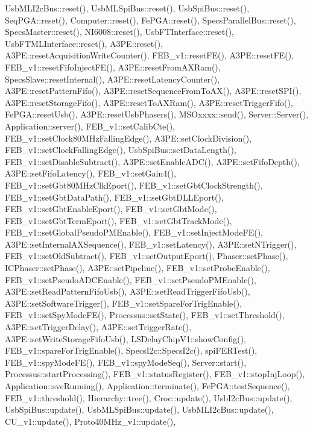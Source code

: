Usb\+M\+L\+I2c\+Bus\+::reset(), Usb\+M\+L\+Spi\+Bus\+::reset(), Usb\+Spi\+Bus\+::reset(), Seq\+P\+G\+A\+::reset(), Computer\+::reset(), Fe\+P\+G\+A\+::reset(), Specs\+Parallel\+Bus\+::reset(), Specs\+Master\+::reset(), N\+I6008\+::reset(), Usb\+F\+T\+Interface\+::reset(), Usb\+F\+T\+M\+L\+Interface\+::reset(), A3\+P\+E\+::reset(), A3\+P\+E\+::reset\+Acquisition\+Write\+Counter(), F\+E\+B\+\_\+v1\+::reset\+F\+E(), A3\+P\+E\+::reset\+F\+E(), F\+E\+B\+\_\+v1\+::reset\+Fifo\+Inject\+F\+E(), A3\+P\+E\+::reset\+From\+A\+X\+Ram(), Specs\+Slave\+::reset\+Internal(), A3\+P\+E\+::reset\+Latency\+Counter(), A3\+P\+E\+::reset\+Pattern\+Fifo(), A3\+P\+E\+::reset\+Sequence\+From\+To\+A\+X(), A3\+P\+E\+::reset\+S\+P\+I(), A3\+P\+E\+::reset\+Storage\+Fifo(), A3\+P\+E\+::reset\+To\+A\+X\+Ram(), A3\+P\+E\+::reset\+Trigger\+Fifo(), Fe\+P\+G\+A\+::reset\+Usb(), A3\+P\+E\+::reset\+Usb\+Phasers(), M\+S\+Oxxxx\+::send(), Server\+::\+Server(), Application\+::server(), F\+E\+B\+\_\+v1\+::set\+Calib\+Cte(), F\+E\+B\+\_\+v1\+::set\+Clock80\+M\+Hz\+Falling\+Edge(), A3\+P\+E\+::set\+Clock\+Division(), F\+E\+B\+\_\+v1\+::set\+Clock\+Falling\+Edge(), Usb\+Spi\+Bus\+::set\+Data\+Length(), F\+E\+B\+\_\+v1\+::set\+Disable\+Subtract(), A3\+P\+E\+::set\+Enable\+A\+D\+C(), A3\+P\+E\+::set\+Fifo\+Depth(), A3\+P\+E\+::set\+Fifo\+Latency(), F\+E\+B\+\_\+v1\+::set\+Gain4(), F\+E\+B\+\_\+v1\+::set\+Gbt80\+M\+Hz\+Clk\+Eport(), F\+E\+B\+\_\+v1\+::set\+Gbt\+Clock\+Strength(), F\+E\+B\+\_\+v1\+::set\+Gbt\+Data\+Path(), F\+E\+B\+\_\+v1\+::set\+Gbt\+D\+L\+L\+Eport(), F\+E\+B\+\_\+v1\+::set\+Gbt\+Enable\+Eport(), F\+E\+B\+\_\+v1\+::set\+Gbt\+Mode(), F\+E\+B\+\_\+v1\+::set\+Gbt\+Term\+Eport(), F\+E\+B\+\_\+v1\+::set\+Gbt\+Track\+Mode(), F\+E\+B\+\_\+v1\+::set\+Global\+Pseudo\+P\+M\+Enable(), F\+E\+B\+\_\+v1\+::set\+Inject\+Mode\+F\+E(), A3\+P\+E\+::set\+Internal\+A\+X\+Sequence(), F\+E\+B\+\_\+v1\+::set\+Latency(), A3\+P\+E\+::set\+N\+Trigger(), F\+E\+B\+\_\+v1\+::set\+Old\+Subtract(), F\+E\+B\+\_\+v1\+::set\+Output\+Eport(), Phaser\+::set\+Phase(), I\+C\+Phaser\+::set\+Phase(), A3\+P\+E\+::set\+Pipeline(), F\+E\+B\+\_\+v1\+::set\+Probe\+Enable(), F\+E\+B\+\_\+v1\+::set\+Pseudo\+A\+D\+C\+Enable(), F\+E\+B\+\_\+v1\+::set\+Pseudo\+P\+M\+Enable(), A3\+P\+E\+::set\+Read\+Pattern\+Fifo\+Usb(), A3\+P\+E\+::set\+Read\+Trigger\+Fifo\+Usb(), A3\+P\+E\+::set\+Software\+Trigger(), F\+E\+B\+\_\+v1\+::set\+Spare\+For\+Trig\+Enable(), F\+E\+B\+\_\+v1\+::set\+Spy\+Mode\+F\+E(), Processus\+::set\+State(), F\+E\+B\+\_\+v1\+::set\+Threshold(), A3\+P\+E\+::set\+Trigger\+Delay(), A3\+P\+E\+::set\+Trigger\+Rate(), A3\+P\+E\+::set\+Write\+Storage\+Fifo\+Usb(), L\+S\+Delay\+Chip\+V1\+::show\+Config(), F\+E\+B\+\_\+v1\+::spare\+For\+Trig\+Enable(), Specs\+I2c\+::\+Specs\+I2c(), spi\+F\+E\+R\+Test(), F\+E\+B\+\_\+v1\+::spy\+Mode\+F\+E(), F\+E\+B\+\_\+v1\+::spy\+Mode\+Seq(), Server\+::start(), Processus\+::start\+Processing(), F\+E\+B\+\_\+v1\+::status\+Register(), F\+E\+B\+\_\+v1\+::stop\+Inj\+Loop(), Application\+::svc\+Running(), Application\+::terminate(), Fe\+P\+G\+A\+::test\+Sequence(), F\+E\+B\+\_\+v1\+::threshold(), Hierarchy\+::tree(), Croc\+::update(), Usb\+I2c\+Bus\+::update(), Usb\+Spi\+Bus\+::update(), Usb\+M\+L\+Spi\+Bus\+::update(), Usb\+M\+L\+I2c\+Bus\+::update(), C\+U\+\_\+v1\+::update(), Proto40\+M\+Hz\+\_\+v1\+::update(), 